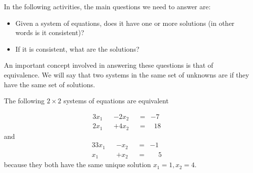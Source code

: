 \documentclass{ximera}
\begin{document}
In the following activities, the main questions we need to answer are:
\begin{itemize}
\item Given a system of equations, does it have one or more solutions (in other words is it consistent)?
\item If it is consistent, what are the solutions?
\end{itemize}

An important concept involved in answering these questions is that of equivalence. We will say that two systems in the same set of unknowns are  if they have the same set of solutions.

\begin{example} The following $2\times 2$ systems of equations are equivalent

\begin{alignat*}{3}
    x_1 && - 2x_2 && =& -7 \\
    2x_1 && + 4x_2 && =& \phantom{1}18 
  \end{alignat*}
  and \begin{alignat*}{3}
    3x_1 && - x_2 && =& -1 \\
    x_1 && + x_2 && =& \phantom{-}5 
  \end{alignat*}
because they both have the same unique solution $x_1 = 1, x_2 = 4$.
\end{example}
\end{document}
